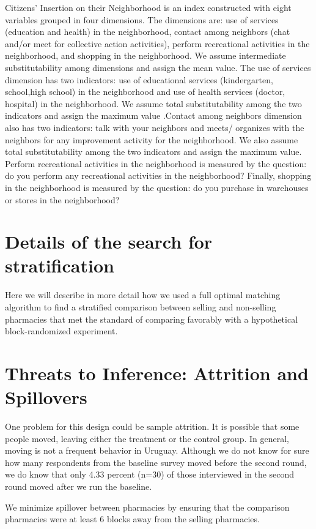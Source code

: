 \documentclass[11pt]{article}
\begin{document}
Citizens' Insertion on their Neighborhood is an index constructed with eight variables grouped in four dimensions. The dimensions are: use of services (education and health) in the neighborhood, contact among neighbors (chat and/or meet for collective action activities), perform recreational activities in the neighborhood, and shopping in the neighborhood. We assume intermediate substitutability among dimensions and assign the mean value. The use of services dimension has two indicators: use of educational services (kindergarten, school,high school) in the neighborhood and use of health services (doctor, hospital) in the neighborhood. We assume total substitutability among the two indicators and assign the maximum value  \citep{goertz2006social}.Contact among neighbors dimension also has two indicators: talk with your neighbors and meets/ organizes with the neighbors for any improvement activity for the neighborhood. We also assume total substitutability among the two indicators and assign the maximum value. Perform recreational activities in the neighborhood is measured by the question: do you perform any recreational activities in the neighborhood? Finally, shopping in the neighborhood is measured by the question: do you purchase in warehouses or stores in the neighborhood?

\section{Details of the search for stratification}

Here we will describe in more detail how we used a full optimal matching algorithm \citep{hansen:2004} to find a stratified comparison between selling and non-selling pharmacies that met the standard of comparing favorably with a hypothetical block-randomized experiment.

\section{Threats to Inference: Attrition and Spillovers}
One problem for this design could be sample attrition. It is possible that some people moved, leaving either the treatment or the control group. In general, moving is not a frequent behavior in Uruguay. Although we do not know for sure how many respondents from the baseline survey moved before the second round, we do know that only 4.33 percent (n=30) of those interviewed in the second round moved after we run the baseline.

We minimize spillover between pharmacies by ensuring that the comparison pharmacies were at least 6 blocks away from the selling pharmacies.
\end{document}
